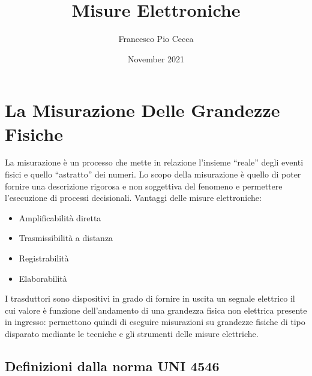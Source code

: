 \documentclass{article}
\title{Misure Elettroniche}
\author{Francesco Pio Cecca}
\date{November 2021}
\begin{document}
\maketitle

\section{La Misurazione Delle Grandezze Fisiche}

La misurazione è un processo che mette in relazione l'insieme “reale” degli eventi fisici e quello 
“astratto” dei numeri. Lo scopo della misurazione è quello di poter fornire una descrizione rigorosa 
e non soggettiva del fenomeno e permettere l'esecuzione di processi decisionali. 
Vantaggi delle misure elettroniche: 
\begin{itemize}
    \item Amplificabilità diretta 
    \item Trasmissibilità a distanza 
    \item Registrabilità 
    \item Elaborabilità 
\end{itemize} 

I trasduttori sono dispositivi in grado di fornire in uscita un segnale elettrico il cui valore è funzione 
dell'andamento di una grandezza fisica non elettrica presente in ingresso: permettono quindi di 
eseguire misurazioni su grandezze fisiche di tipo disparato mediante le tecniche e gli strumenti 
delle misure elettriche.

\subsection{Definizioni dalla norma UNI 4546}
\end{document}
